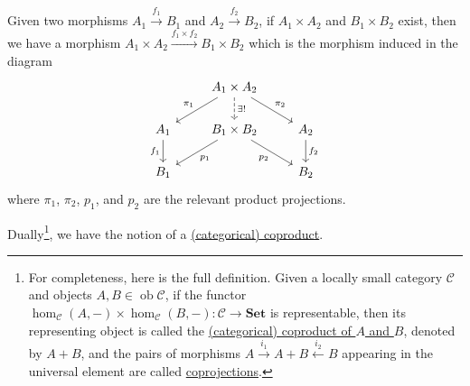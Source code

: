 \documentclass[a4paper,11pt]{article}
\theoremstyle{break_italics}
\theoremstyle{break_upright}
\theoremstyle{remark}
\newcommand{\ob}{\operatorname{ob}}
\newcommand{\C}{\mathcal{C}}
\newcommand{\Set}{\mathbf{Set}}
\begin{document}
Given two morphisms $A_1 \xrightarrow{f_1} B_1$ and $A_2 \xrightarrow{f_2} B_2$, if $A_1 \times A_2$ and $B_1 \times B_2$ exist, then we have a morphism $A_1 \times A_2 \xrightarrow{f_1 \times f_2} B_1 \times B_2$ which is the morphism induced in the diagram 
\[
\begin{tikzcd}
                      & A_1 \times A_2 \arrow[ld, "\pi_1"'] \arrow[rd, "\pi_2"] \arrow[d, "\exists!", dashed] &                      \\
A_1 \arrow[d, "f_1"'] & B_1 \times B_2 \arrow[ld, "p_1"] \arrow[rd, "p_2"']                                   & A_2 \arrow[d, "f_2"] \\
B_1                   &                                                                                       & B_2                 
\end{tikzcd}
\]
where $\pi_1$, $\pi_2$, $p_1$, and $p_2$ are the relevant product projections.

Dually\footnote{For completeness, here is the full definition. Given a locally small category $\C$ and objects $A,B \in \ob\C$, if the functor $\hom_\C(A,-) \times \hom_\C(B,-) \colon \C \to \Set$ is representable, then its representing object is called the \uline{(categorical) coproduct of $A$ and $B$}, denoted by $A + B$, and the pairs of morphisms $A \xrightarrow{i_1} A + B \xleftarrow{i_2} B$ appearing in the universal element are called \uline{coprojections}.}, we have the notion of a \uline{(categorical) coproduct}.
\end{document}

